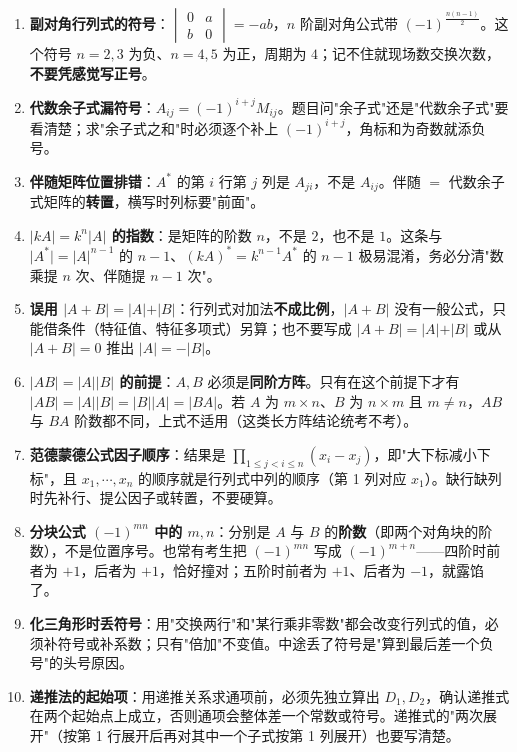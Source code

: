 \documentclass[11pt,openany,UTF8]{ctexbook}
\begin{document}
\begin{enumerate}
\item \textbf{副对角行列式的符号}：$\begin{vmatrix}0&a\\b&0\end{vmatrix}=-ab$，$n$ 阶副对角公式带 $(-1)^{\frac{n(n-1)}{2}}$。这个符号 $n=2,3$ 为负、$n=4,5$ 为正，周期为 $4$；记不住就现场数交换次数，\textbf{不要凭感觉写正号}。
\item \textbf{代数余子式漏符号}：$A_{ij}=(-1)^{i+j}M_{ij}$。题目问"余子式"还是"代数余子式"要看清楚；求"余子式之和"时必须逐个补上 $(-1)^{i+j}$，角标和为奇数就添负号。
\item \textbf{伴随矩阵位置排错}：$A^*$ 的第 $i$ 行第 $j$ 列是 $A_{ji}$，不是 $A_{ij}$。伴随 $=$ 代数余子式矩阵的\textbf{转置}，横写时列标要"前面"。
\item \textbf{$\vert kA\vert=k^n\vert A\vert$ 的指数}：是矩阵的阶数 $n$，不是 $2$，也不是 $1$。这条与 $\vert A^*\vert=\vert A\vert^{n-1}$ 的 $n-1$、$(kA)^*=k^{n-1}A^*$ 的 $n-1$ 极易混淆，务必分清"数乘提 $n$ 次、伴随提 $n-1$ 次"。
\item \textbf{误用 $\vert A+B\vert=\vert A\vert+\vert B\vert$}：行列式对加法\textbf{不成比例}，$\vert A+B\vert$ 没有一般公式，只能借条件（特征值、特征多项式）另算；也不要写成 $\vert A+B\vert=\vert A\vert+\vert B\vert$ 或从 $\vert A+B\vert=0$ 推出 $\vert A\vert=-\vert B\vert$。
\item \textbf{$\vert AB\vert=\vert A\vert\vert B\vert$ 的前提}：$A,B$ 必须是\textbf{同阶方阵}。只有在这个前提下才有 $\vert AB\vert=\vert A\vert\vert B\vert=\vert B\vert\vert A\vert=\vert BA\vert$。若 $A$ 为 $m\times n$、$B$ 为 $n\times m$ 且 $m\ne n$，$AB$ 与 $BA$ 阶数都不同，上式不适用（这类长方阵结论统考不考）。
\item \textbf{范德蒙德公式因子顺序}：结果是 $\prod_{1\le j<i\le n}(x_i-x_j)$，即"大下标减小下标"，且 $x_1,\cdots,x_n$ 的顺序就是行列式中列的顺序（第 1 列对应 $x_1$）。缺行缺列时先补行、提公因子或转置，不要硬算。
\item \textbf{分块公式 $(-1)^{mn}$ 中的 $m,n$}：分别是 $A$ 与 $B$ 的\textbf{阶数}（即两个对角块的阶数），不是位置序号。也常有考生把 $(-1)^{mn}$ 写成 $(-1)^{m+n}$——四阶时前者为 $+1$，后者为 $+1$，恰好撞对；五阶时前者为 $+1$、后者为 $-1$，就露馅了。
\item \textbf{化三角形时丢符号}：用"交换两行"和"某行乘非零数"都会改变行列式的值，必须补符号或补系数；只有"倍加"不变值。中途丢了符号是"算到最后差一个负号"的头号原因。
\item \textbf{递推法的起始项}：用递推关系求通项前，必须先独立算出 $D_1,D_2$，确认递推式在两个起始点上成立，否则通项会整体差一个常数或符号。递推式的"两次展开"（按第 1 行展开后再对其中一个子式按第 1 列展开）也要写清楚。

\end{enumerate}
\end{document}
